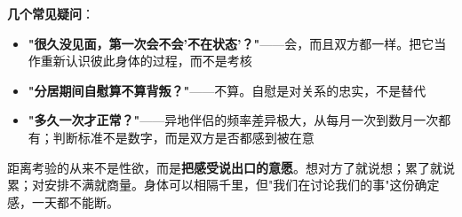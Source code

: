 \vspace{0.5em}
\noindent\textbf{几个常见疑问}：

\begin{itemize}
	\item \textbf{"很久没见面，第一次会不会'不在状态'？"}——会，而且双方都一样。把它当作重新认识彼此身体的过程，而不是考核
	\item \textbf{"分居期间自慰算不算背叛？"}——不算。自慰是对关系的忠实，不是替代
	\item \textbf{"多久一次才正常？"}——异地伴侣的频率差异极大，从每月一次到数月一次都有；判断标准不是数字，而是双方是否都感到被在意
\end{itemize}

\begin{tcolorbox}[colback=blue!5!white,colframe=blue!50!black,title=贴心小叮咛]
距离考验的从来不是性欲，而是\textbf{把感受说出口的意愿}。想对方了就说想；累了就说累；对安排不满就商量。身体可以相隔千里，但"我们在讨论我们的事"这份确定感，一天都不能断。
\end{tcolorbox}

